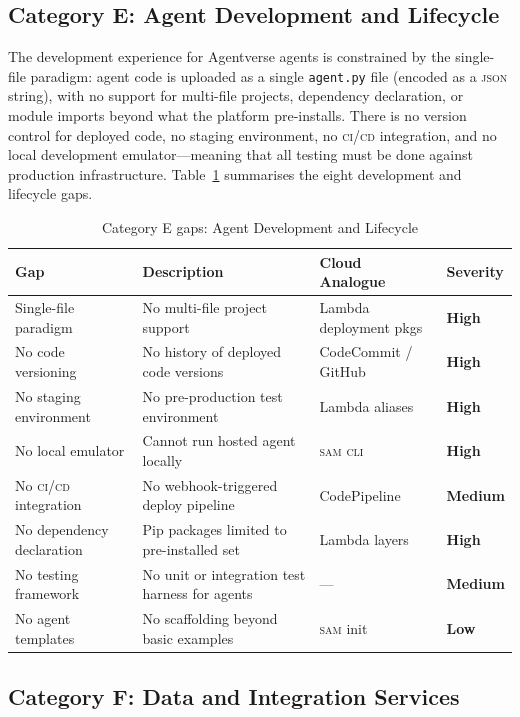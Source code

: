 \documentclass[twoside,11pt]{article}
\newcommand{\high}{\textcolor{red!70!black}{\textbf{High}}}
\newcommand{\medium}{\textcolor{orange!80!black}{\textbf{Medium}}}
\newcommand{\low}{\textcolor{green!50!black}{\textbf{Low}}}
\begin{document}
\subsection{Category E: Agent Development and Lifecycle}
\label{subsec:gap-dev}

The development experience for Agentverse agents is constrained by the
single-file paradigm: agent code is uploaded as a single \texttt{agent.py}
file (encoded as a \textsc{json} string), with no support for multi-file
projects, dependency declaration, or module imports beyond what the platform
pre-installs.  There is no version control for deployed code, no staging
environment, no \textsc{ci/cd} integration, and no local development
emulator---meaning that all testing must be done against production
infrastructure.  Table~\ref{tab:gap-dev} summarises the eight development
and lifecycle gaps.

\begin{table}[htbp]
\centering
\caption{Category E gaps: Agent Development and Lifecycle}
\label{tab:gap-dev}
\begin{tabular}{>{\raggedright\arraybackslash}p{3.2cm} >{\raggedright\arraybackslash}p{5.5cm} >{\raggedright\arraybackslash}p{2.9cm} l}
\toprule
\textbf{Gap} & \textbf{Description} & \textbf{Cloud Analogue} &
\textbf{Severity} \\
\midrule
Single-file paradigm & No multi-file project support & Lambda deployment pkgs &
\high \\
No code versioning & No history of deployed code versions & CodeCommit /
GitHub & \high \\
No staging environment & No pre-production test environment & Lambda aliases &
\high \\
No local emulator & Cannot run hosted agent locally & \textsc{sam cli} &
\high \\
No \textsc{ci/cd} integration & No webhook-triggered deploy pipeline &
CodePipeline & \medium \\
No dependency declaration & Pip packages limited to pre-installed set & Lambda
layers & \high \\
No testing framework & No unit or integration test harness for agents & --- &
\medium \\
No agent templates & No scaffolding beyond basic examples & \textsc{sam} init &
\low \\
\bottomrule
\end{tabular}
\end{table}

\subsection{Category F: Data and Integration Services}
\label{subsec:gap-data}
\end{document}
